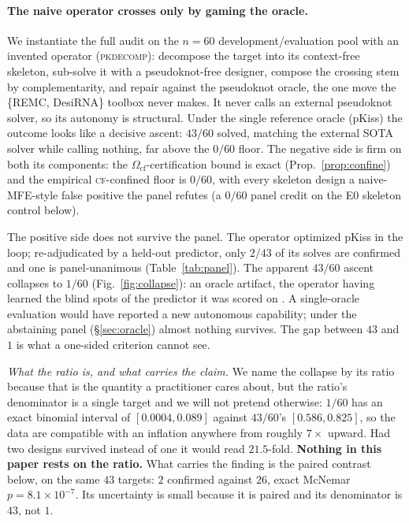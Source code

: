 \documentclass[11pt]{article}
\newcommand{\CF}{\textsc{cf}}
\newcommand{\Ocf}{\ensuremath{\Omega_{\mathrm{cf}}}}
\begin{document}
\paragraph{The naive operator crosses only by gaming the oracle.} We instantiate the full audit on
the $n=60$ development/evaluation pool with an invented operator (\textsc{pkdecomp}): decompose the target into its
context-free skeleton, sub-solve it with a pseudoknot-free designer, compose the crossing stem by
complementarity, and repair against the pseudoknot oracle, the one move the \{REMC, DesiRNA\} toolbox never
makes. It never calls an external pseudoknot solver, so its autonomy is structural. Under the single
reference oracle (pKiss) the outcome looks like a decisive ascent: $43/60$ solved, matching the external SOTA solver while calling nothing, far above the $0/60$
floor. The negative side is firm on both its components: the $\Ocf$-certification bound is exact (Prop.~\ref{prop:confine})
and the empirical \CF-confined floor is $0/60$, with every skeleton design a naive-MFE-style false positive the
panel refutes (a $0/60$ panel credit on the E0 skeleton control below).

The positive side does not survive the panel. The operator optimized pKiss in the loop; re-adjudicated by
a held-out predictor, only $2/43$ of its solves are confirmed and one is panel-unanimous
(Table~\ref{tab:panel}). The apparent $43/60$ ascent collapses to
$1/60$ (Fig.~\ref{fig:collapse}): an oracle artifact, the operator having learned the blind spots of the predictor it was scored on
\citep{skalse2022,gao2023overopt}. A single-oracle evaluation would have reported a new autonomous
capability; under the abstaining panel (\S\ref{sec:oracle}) almost nothing survives. The gap between $43$
and $1$ is what a one-sided criterion cannot see.

\emph{What the ratio is, and what carries the claim.} We name the collapse by its ratio because that is the
quantity a practitioner cares about, but the ratio's denominator is a single target and we will not pretend
otherwise: $1/60$ has an exact binomial interval of $[0.0004,0.089]$ against $43/60$'s $[0.586,0.825]$, so the
data are compatible with an inflation anywhere from roughly $7\times$ upward. Had two designs survived instead
of one it would read $21.5$-fold. \textbf{Nothing in this paper rests on the ratio.} What carries the finding is the paired contrast below, on the same $43$ targets: $2$ confirmed against $26$,
exact McNemar $p{=}8.1\!\times\!10^{-7}$. Its uncertainty is small because it is paired and its denominator is
$43$, not $1$.
\end{document}

